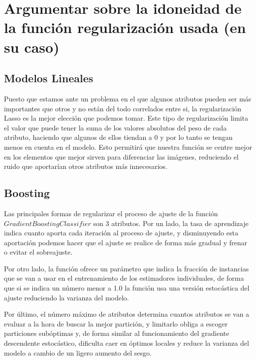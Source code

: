\documentclass{article}
\begin{document}
	\section{Argumentar sobre la idoneidad de la función regularización usada (en su caso)}
	
	\subsection{Modelos Lineales}
	Puesto que estamos ante un problema en el que algunos atributos pueden ser más importantes que otros y no están del todo correlados entre si, la regularización Lasso es la mejor elección que podemos tomar. Este tipo de regularización limita el valor que puede tener la suma de los valores absolutos del peso de cada atributo, haciendo que algunos de ellos tiendan a 0 y por lo tanto se tengan menos en cuenta en el modelo. Esto permitirá que nuestra función se centre mejor en los elementos que mejor sirven para diferenciar las imágenes, reduciendo el ruido que aportarían otros atributos más innecesarios.
	\subsection{Boosting}
	Las principales formas de regularizar el proceso de ajuste de la función $GradientBoostingClassifier$ son 3 atributos. Por un lado, la tasa de aprendizaje indica cuanto aporta cada iteración al proceso de ajuste, y disminuyendo esta aportación podemos hacer que el ajuste se realice de forma más gradual y frenar o evitar el sobreajuste. 
	\par 
	Por otro lado, la función ofrece un parámetro que indica la fracción de instancias que se van a usar en el entrenamiento de los estimadores individuales, de forma que si se indica un número menor a 1.0 la función usa una versión estocástica del ajuste reduciendo la varianza del modelo.
	\par 
	Por último, el número máximo de atributos determina cuantos atributos se van a evaluar a la hora de buscar la mejor partición, y limitarlo obliga a escoger particiones subóptimas y, de forma similar al funcionamiento del gradiente descendente estocástico, dificulta caer en óptimos locales y reduce la varianza del modelo a cambio de un ligero aumento del sesgo.
\end{document}
